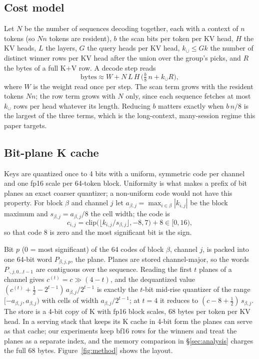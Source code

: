 \documentclass[10pt,twocolumn]{article}
\begin{document}
\subsection{Cost model}
Let $N$ be the number of sequences decoding together, each with a context of $n$ tokens (so $Nn$ tokens are resident), $b$ the scan bits per token per KV head, $H$ the KV heads, $L$ the layers, $G$ the query heads per KV head, $k_\cup\le Gk$ the number of distinct winner rows per KV head after the union over the group's picks, and $R$ the bytes of a full K$+$V row. A decode step reads
\begin{equation}
\text{bytes} \approx W + N\,L\,H\,\Big(\tfrac{b}{8}\,n + k_\cup R\Big),
\end{equation}
where $W$ is the weight read once per step. The scan term grows with the resident tokens $Nn$; the row term grows with $N$ only, since each sequence fetches at most $k_\cup$ rows per head whatever its length. Reducing $b$ matters exactly when $b\,n/8$ is the largest of the three terms, which is the long-context, many-session regime this paper targets.

\subsection{Bit-plane K cache}
Keys are quantized once to 4 bits with a uniform, symmetric code per channel and one fp16 scale per 64-token block. Uniformity is what makes a prefix of bit planes an exact coarser quantizer; a non-uniform code would not have this property. For block $\beta$ and channel $j$ let $a_{\beta,j}=\max_{i\in\beta}|k_{i,j}|$ be the block maximum and $s_{\beta,j}=a_{\beta,j}/8$ the cell width; the code is
\begin{equation}
c_{i,j}=\mathrm{clip}\big(\lfloor k_{i,j}/s_{\beta,j}\rfloor,-8,7\big)+8\in[0,16),
\end{equation}
so that code 8 is zero and the most significant bit is the sign.

Bit $p$ ($0$ = most significant) of the 64 codes of block $\beta$, channel $j$, is packed into one 64-bit word $P_{\beta,j,p}$, the plane. Planes are stored channel-major, so the words $P_{\cdot,j,0\ldots t-1}$ are contiguous over the sequence. Reading the first $t$ planes of a channel gives $c^{(t)}=c\gg(4-t)$, and the dequantized value $(c^{(t)}+\tfrac12-2^{t-1})\,a_{\beta,j}/2^{t-1}$ is exactly the $t$-bit mid-rise quantizer of the range $[-a_{\beta,j},a_{\beta,j})$ with cells of width $a_{\beta,j}/2^{t-1}$; at $t=4$ it reduces to $(c-8+\tfrac12)\,s_{\beta,j}$. The store is a 4-bit copy of K with fp16 block scales, 68 bytes per token per KV head. In a serving stack that keeps its K cache in 4-bit form the planes can serve as that cache; our experiments keep bf16 rows for the winners and treat the planes as a separate index, and the memory comparison in \S\ref{sec:analysis} charges the full 68 bytes. Figure~\ref{fig:method} shows the layout.
\end{document}
